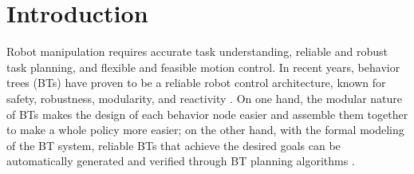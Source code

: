 \documentclass{article}
\begin{document}





\section{Introduction}


Robot manipulation requires accurate task understanding, reliable and robust task planning, and flexible and feasible motion control. In recent years, behavior trees (BTs) \cite{colledanchise2018behavior,ogren2022behavior} have proven to be a reliable robot control architecture, known for safety, robustness, modularity, and reactivity \cite{colledanchise2019blended,colledanchise2016how}. On one hand, the modular nature of BTs makes the design of each behavior node easier and assemble them together to make a whole policy more easier; on the other hand, with the formal modeling of the BT system, reliable BTs that achieve the desired goals can be automatically generated and verified through BT planning algorithms \cite{cai2021bt,chen2024integrating,cai2025mrbtp}.


\end{document}
